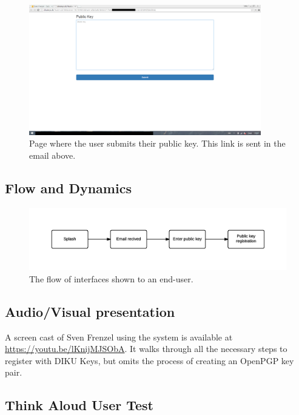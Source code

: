 \documentclass[11pt,a4paper]{report}
\begin{document}
\begin{figure}[H]
\centering
\includegraphics[width=0.9\textwidth]{pictures/screenshots/publickey}
\caption{Page where the user submits their public key. This link is sent in the email above.}
\label{fig:ss_pubkey}
\end{figure}

\subsection{Flow and Dynamics}

\begin{figure}[H]
    \centering
    \includegraphics[width=1\textwidth]{pictures/flow_diagram}
    \caption{The flow of interfaces shown to an end-user.}
    \label{fig:flow_diagram}
\end{figure}


\subsection{Audio/Visual presentation} \label{sec:youtube}

A screen cast of Sven Frenzel using the system is available at \href{https://youtu.be/lKnijMJSObA}{https://youtu.be/lKnijMJSObA}. It walks through all the necessary steps to register with DIKU Keys, but omits the process of creating an OpenPGP key pair.
\subsection{Think Aloud User Test}
\end{document}
